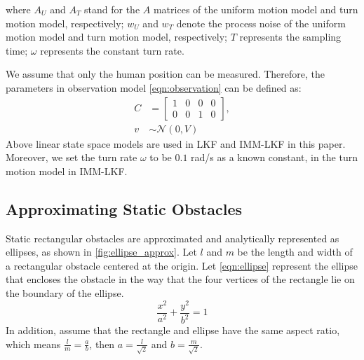 \documentclass[letterpaper, 10 pt, conference]{ieeeconf}
\begin{document}
	where $A_U$ and $A_T$ stand for the $A$ matrices of the uniform motion model and turn motion model, respectively; $w_U$ and $w_T$ denote the process noise of the uniform motion model and turn motion model, respectively; $T$ represents the sampling time; $\omega$ represents the constant turn rate.
	
	We assume that only the human position can be measured.
	Therefore, the parameters in observation model \cref{eqn:observation} can be defined as:
	\begin{subequations}
		\begin{align}
			C&=\left[
			\begin{array}{cccc}
				1& 0& 0& 0\\
				0& 0& 1& 0
			\end{array}\right],\label{eqn:C}\\
			v&\sim\mathcal{N}(0,V)\label{eqn:meas_noise}
		\end{align}
	\end{subequations}
	Above linear state space models are used in LKF and IMM-LKF in this paper.
	Moreover, we set the turn rate $\omega$ to be $0.1$ rad/s as a known constant, in the turn motion model in IMM-LKF. 
	
	\subsection{Approximating Static Obstacles}
	Static rectangular obstacles are approximated and analytically represented as ellipses, as shown in \cref{fig:ellipse_approx}.
	Let $l$ and $m$ be the length and width of a rectangular obstacle centered at the origin.
	Let \cref{eqn:ellipse} represent the ellipse that encloses the obstacle in the way that the four vertices of the rectangle lie on the boundary of the ellipse.
	\begin{equation*}\label{eqn:ellipse}
		\frac{x^2}{a^2}+\frac{y^2}{b^2}=1
	\end{equation*}
	In addition, assume that the rectangle and ellipse have the same aspect ratio, which means $\frac{l}{m}=\frac{a}{b}$, then $a=\frac{l}{\sqrt{2}}$ and $b=\frac{m}{\sqrt{2}}$.
	
	
	
	\addtolength{\textheight}{-12cm}   %
	
	
	
	
	
\end{document}
